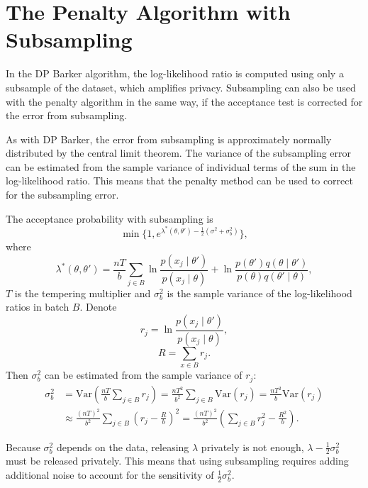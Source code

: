 \documentclass[english,twoside,openright]{HYgraduMLDS}
\newcommand{\var}{\mathrm{Var}}
\begin{document}
\section{The Penalty Algorithm with Subsampling}\label{dp_minibatch_penalty_section}

In the DP Barker algorithm, the log-likelihood ratio is computed using only
a subsample of the dataset, which amplifies privacy. Subsampling can also be used
with the penalty algorithm in the same way, if the acceptance test is 
corrected for the error from subsampling.

As with DP Barker, the error from subsampling is approximately normally 
distributed by the central limit theorem. The variance of the subsampling 
error can be estimated from the sample variance of individual terms of the 
sum in the log-likelihood ratio. This means that the penalty method can be used
to correct for the subsampling error.

The acceptance probability with subsampling is
\[
    \min\{1, e^{\lambda^*(\theta, \theta') - \frac{1}{2}(\sigma^2 + \sigma_b^2)}\},
\]
where
\[
    \lambda^*(\theta, \theta') = \frac{nT}{b}\sum_{j\in B}
    \ln \frac{p(x_j\mid \theta')}{p(x_j \mid \theta)}
    + \ln \frac{p(\theta')q(\theta \mid \theta')}{p(\theta)q(\theta' \mid \theta)},
\]
\(T\) is the tempering multiplier
and \(\sigma_b^2\) is the sample variance of the log-likelihood ratios in
batch \(B\). Denote
\[
    r_j = \ln \frac{p(x_j\mid \theta')}{p(x_j\mid \theta)},
\]
\[
    R = \sum_{x\in B}r_j.
\]
Then \(\sigma^2_b\) can be estimated from the sample variance of \(r_j\):
\begin{align*}
    \sigma_b^2 
    &= \var\left(\frac{nT}{b}\sum_{j\in B}r_j\right)
    = \frac{nT^2}{b^2}\sum_{j\in B}\var(r_j)
    = \frac{nT^2}{b}\var(r_j)
  \\&\approx\frac{(nT)^2}{b^2}
    \sum_{j\in B}\left(r_j - \frac{R}{b}\right)^2
    = \frac{(nT)^2}{b^2}\left(\sum_{j\in B}r_j^2 - \frac{R^2}{b}\right).
\end{align*}

Because \(\sigma_b^2\) depends on the data, releasing \(\lambda\) privately is 
not enough, \(\lambda - \frac{1}{2}\sigma_b^2\) must be released privately.
This means that using subsampling requires adding additional noise to account 
for the sensitivity of \(\frac{1}{2}\sigma_b^2\).
\end{document}
